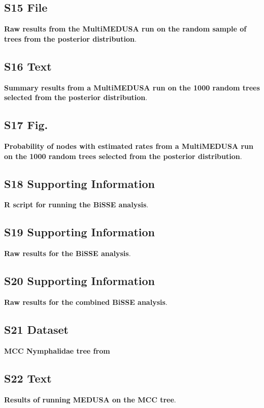 \documentclass[10pt,letterpaper]{article}
\begin{document}
\subsection*{S15 File}
\label{S15_File}
{\bf Raw results from the MultiMEDUSA run on the random sample of trees from 
the posterior distribution}.

\subsection*{S16 Text}
\label{S16_Text}
{\bf Summary results from a
MultiMEDUSA run on the 1000 random trees selected from the posterior
distribution}.

\subsection*{S17 Fig.}
\label{S17_Figure}
{\bf Probability of nodes with
estimated rates from a MultiMEDUSA run on the 1000 random trees selected
from the posterior distribution}.

\subsection*{S18 Supporting Information}
\label{S18_Supporting_Information}
{\bf R script for running the BiSSE analysis}.

\subsection*{S19 Supporting Information}
\label{S19_Supporting_Information}
{\bf Raw results for the BiSSE analysis}.

\subsection*{S20 Supporting Information}
\label{S20_Supporting_Information}
{\bf Raw results for the combined BiSSE analysis}.

\subsection*{S21 Dataset}
\label{S21_Dataset}
{\bf MCC Nymphalidae tree from \cite{wahlberg2009}}

\subsection*{S22 Text}
\label{S22_Text}
{\bf Results of running MEDUSA on the MCC tree}.
\end{document}
